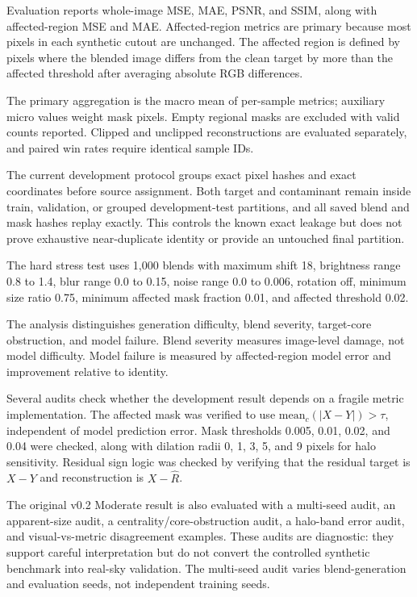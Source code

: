 Evaluation reports whole-image MSE, MAE, PSNR, and SSIM, along with
affected-region MSE and MAE. Affected-region metrics are primary because most
pixels in each synthetic cutout are unchanged. The affected region is defined by
pixels where the blended image differs from the clean target by more than the
affected threshold after averaging absolute RGB differences.

The primary aggregation is the macro mean of per-sample metrics; auxiliary
micro values weight mask pixels. Empty regional masks are excluded with valid
counts reported. Clipped and unclipped reconstructions are evaluated
separately, and paired win rates require identical sample IDs.

The current development protocol groups exact pixel hashes and exact
coordinates before source assignment. Both target and contaminant remain inside
train, validation, or grouped development-test partitions, and all saved blend
and mask hashes replay exactly. This controls the known exact leakage but does
not prove exhaustive near-duplicate identity or provide an untouched final
partition.

The hard stress test uses 1,000 blends with maximum shift 18, brightness range
0.8 to 1.4, blur range 0.0 to 0.15, noise range 0.0 to 0.006, rotation off,
minimum size ratio 0.75, minimum affected mask fraction 0.01, and affected
threshold 0.02.

The analysis distinguishes generation difficulty, blend severity, target-core
obstruction, and model failure. Blend severity measures image-level damage, not
model difficulty. Model failure is measured by affected-region model error and
improvement relative to identity.

Several audits check whether the development result depends on a
fragile metric implementation. The affected mask was verified to use
$\mathrm{mean}_c(|X-Y|) > \tau$, independent of model prediction error. Mask
thresholds 0.005, 0.01, 0.02, and 0.04 were checked, along with dilation radii
0, 1, 3, 5, and 9 pixels for halo sensitivity. Residual sign logic was checked
by verifying that the residual target is $X-Y$ and reconstruction is
$X-\hat{R}$.

The original v0.2 Moderate result is also evaluated with a multi-seed audit, an
apparent-size audit, a centrality/core-obstruction audit, a halo-band error
audit, and visual-vs-metric disagreement examples. These audits are diagnostic:
they support careful interpretation but do not convert the controlled synthetic
benchmark into real-sky validation. The multi-seed audit varies blend-generation
and evaluation seeds, not independent training seeds.
